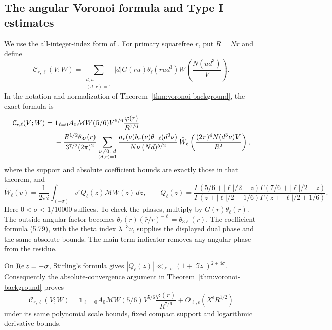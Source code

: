 \subsection{The angular Voronoi formula and Type I estimates}

We use the all-integer-index form of
\cite[Propositions 5.2--5.3]{DR2024}. For primary squarefree $r$,
put $R=Nr$ and define
\[
 \mathcal C_{r,\ell}(V;W)=
 \sum_{\substack{d,u\\(d,r)=1}}|d|G(ru)
       \theta_\ell(rud^3)W\left(\frac{N(ud^3)}V\right).
\]
In the notation and normalization of
Theorem~\ref{thm:voronoi-background}, the exact formula is
\begin{align}
 \mathcal C_{r,\ell}(V;W)
 ={}&\boldsymbol1_{\ell=0}A_0\mathcal MW(5/6)V^{5/6}
                  \frac{\varphi(r)}{R^{7/6}}\notag\\
 &+\frac{R^{1/2}\theta_{3\ell}(r)}{3^{7/2}(2\pi)^2}
 \sum_{\substack{\nu\ne0,\ d\\(d,r)=1}}
 \frac{a_r(\nu)b_r(\nu)\theta_{-\ell}(d^3\nu)}
      {N\nu\,(Nd)^{5/2}}\,
 \check W_\ell\left(\frac{(2\pi)^4N(d^3\nu)V}{R^2}\right),
 \label{eq:angular-voronoi}
\end{align}
where the support and absolute coefficient bounds are exactly those
in that theorem, and
\[
 \check W_\ell(v)=\frac1{2\pi i}\int_{(-\sigma)}
    v^z Q_\ell(z)\mathcal MW(z)\,dz,\qquad
 Q_\ell(z)=
 \frac{\Gamma(5/6+|\ell|/2-z)\Gamma(7/6+|\ell|/2-z)}
      {\Gamma(z+|\ell|/2-1/6)\Gamma(z+|\ell|/2+1/6)}.
\]
Here $0<\sigma<1/10000$ suffices. To check the phases, multiply
\cite[Equation (5.80)]{DR2024} by $G(r)\theta_\ell(r)$.
The outside angular factor becomes
$\theta_\ell(r)(\bar r/r)^{-\ell}=\theta_{3\ell}(r)$.
The coefficient formula (5.79), with the theta index
$\lambda^{-3}\nu$, supplies the displayed dual phase and the same
absolute bounds. The main-term indicator removes any angular phase
from the residue.

On $\operatorname{Re} z=-\sigma$, Stirling's formula gives
$|Q_\ell(z)|\ll_{\ell,\sigma}(1+|\Im z|)^{2+4\sigma}$.
Consequently the absolute-convergence argument in
Theorem~\ref{thm:voronoi-background} proves
\begin{equation}
 \mathcal C_{r,\ell}(V;W)
 =\boldsymbol1_{\ell=0}A_0\mathcal MW(5/6)V^{5/6}
        \frac{\varphi(r)}{R^{7/6}}
       +O_{\ell,\epsilon}(X^\epsilon R^{1/2})
 \label{eq:angular-completed-low}
\end{equation}
under its same polynomial scale bounds, fixed compact support and
logarithmic derivative bounds.


